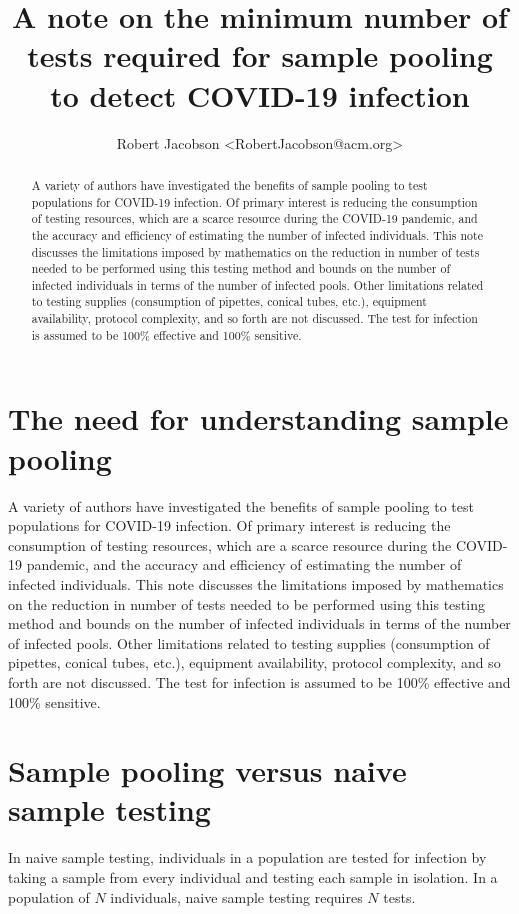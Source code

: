 \documentclass[letterpaper]{article}
\title{A note on the minimum number of tests required for sample
	pooling to detect COVID-19 infection}
\author{Robert Jacobson <RobertJacobson@acm.org>}
\begin{document}
\maketitle

\begin{abstract}
A variety of authors have investigated the benefits of sample pooling to
test populations for COVID-19 infection. Of primary interest is reducing
the consumption of testing resources, which are a scarce resource during
the COVID-19 pandemic, and the accuracy and efficiency of estimating the
number of infected individuals. This note discusses the limitations
imposed by mathematics on the reduction in number of tests needed to be
performed using this testing method and bounds on the number of infected
individuals in terms of the number of infected pools. Other limitations
related to testing supplies (consumption of pipettes, conical tubes,
etc.), equipment availability, protocol complexity, and so forth are not
discussed. The test for infection is assumed to be 100\% effective and
100\% sensitive.
\end{abstract}

\section{The need for understanding sample pooling}
A variety of authors have investigated the benefits of sample pooling to
test populations for COVID-19 infection. Of primary interest is reducing
the consumption of testing resources, which are a scarce resource during
the COVID-19 pandemic, and the accuracy and efficiency of estimating the
number of infected individuals. This note discusses the limitations
imposed by mathematics on the reduction in number of tests needed to be
performed using this testing method and bounds on the number of infected
individuals in terms of the number of infected pools. Other limitations
related to testing supplies (consumption of pipettes, conical tubes,
etc.), equipment availability, protocol complexity, and so forth are not
discussed. The test for infection is assumed to be 100\% effective and
100\% sensitive.

\section{Sample pooling versus naive sample testing}
\label{sample-pooling-versus-naive-sample-testing}

In naive sample testing, individuals in a population are tested for
infection by taking a sample from every individual and testing each
sample in isolation. In a population of $N$ individuals, naive sample
testing requires $N$ tests.
\end{document}
